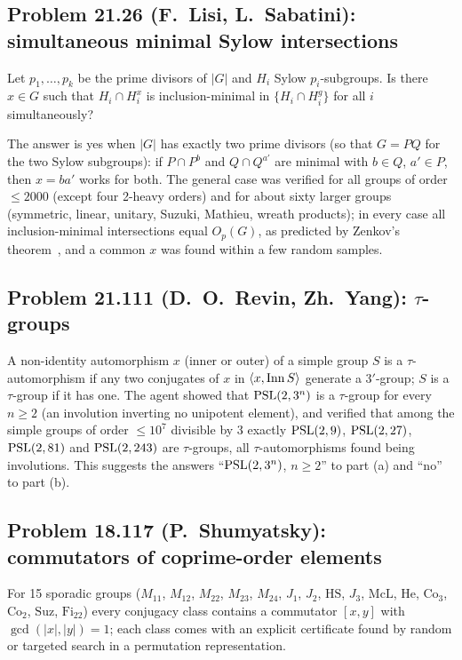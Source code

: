 \subsection{Problem 21.26 (F.~Lisi, L.~Sabatini): simultaneous minimal Sylow intersections}
\begin{problem}[21.26]
Let $p_1,\dots,p_k$ be the prime divisors of $|G|$ and $H_i$ Sylow $p_i$-subgroups. Is there $x\in G$ such that
$H_i\cap H_i^x$ is inclusion-minimal in $\{H_i\cap H_i^g\}$ for all $i$ simultaneously?
\end{problem}
The answer is yes when $|G|$ has exactly two prime divisors (so that $G=PQ$ for the two Sylow subgroups): if
$P\cap P^b$ and $Q\cap Q^{a'}$ are minimal with $b\in Q$, $a'\in P$, then $x=ba'$ works for both. The general
case was verified for all groups of order $\le 2000$ (except four 2-heavy orders) and for about sixty larger groups
(symmetric, linear, unitary, Suzuki, Mathieu, wreath products); in every case all inclusion-minimal intersections
equal $O_p(G)$, as predicted by Zenkov's theorem~\cite{Zenkov}, and a common $x$ was found within a few random samples.

\subsection{Problem 21.111 (D.~O.~Revin, Zh.~Yang): $\tau$-groups}
A non-identity automorphism $x$ (inner or outer) of a simple group $S$ is a $\tau$-automorphism if any two conjugates of $x$ in
$\langle x,\operatorname{Inn} S\rangle$ generate a $3'$-group; $S$ is a $\tau$-group if it has one. The agent showed that
$\mathrm{PSL}(2,3^n)$ is a $\tau$-group for every $n\ge 2$ (an involution inverting no unipotent element), and verified
that among the simple groups of order $\le 10^7$ divisible by 3 exactly $\mathrm{PSL}(2,9)$, $\mathrm{PSL}(2,27)$, $\mathrm{PSL}(2,81)$ and $\mathrm{PSL}(2,243)$ are $\tau$-groups, all $\tau$-automorphisms found being involutions. This suggests the answers
``$\mathrm{PSL}(2,3^n)$, $n\ge 2$'' to part (a) and ``no'' to part (b).

\subsection{Problem 18.117 (P.~Shumyatsky): commutators of coprime-order elements}
For 15 sporadic groups ($M_{11}$, $M_{12}$, $M_{22}$, $M_{23}$, $M_{24}$, $J_1$, $J_2$, $\mathrm{HS}$, $J_3$, $\mathrm{McL}$, $\mathrm{He}$,
$\mathrm{Co}_3$, $\mathrm{Co}_2$, $\mathrm{Suz}$, $\mathrm{Fi}_{22}$) every conjugacy class contains a commutator $[x,y]$ with $\gcd(|x|,|y|)=1$;
each class comes with an explicit certificate found by random or targeted search in a permutation representation.

